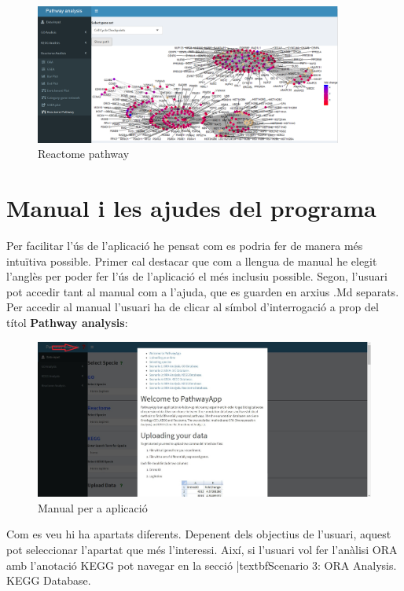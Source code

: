 \begin{figure}[H]
\centering
\includegraphics[width=0.9\textwidth]{figures/App_F21_Items_RA_RAPathway.png} 
\caption{Reactome pathway}
\end{figure}


\section{Manual i les ajudes del programa}

Per facilitar l'ús de l’aplicació he pensat com es podria fer de manera més intuïtiva possible. Primer cal destacar que com a llengua de manual he elegit l’anglès per poder fer l'ús de l'aplicació el més inclusiu possible. Segon, l'usuari pot accedir tant al manual com a l'ajuda, que es guarden en arxius .Md separats. Per accedir al manual l'usuari ha de clicar al símbol d’interrogació a prop del títol \textbf{Pathway analysis}:
\begin{figure}[H]
\centering
\includegraphics[width=1\textwidth]{figures/Manual.jpg} 
\caption{Manual per a aplicació}
\end{figure}

Com es veu hi ha apartats diferents. Depenent dels objectius de l'usuari, aquest pot seleccionar l'apartat que més l'interessi. Així, si l'usuari vol fer l'anàlisi ORA amb l'anotació KEGG pot navegar en la secció |textbf{Scenario 3: ORA Analysis. KEGG Database}. 

